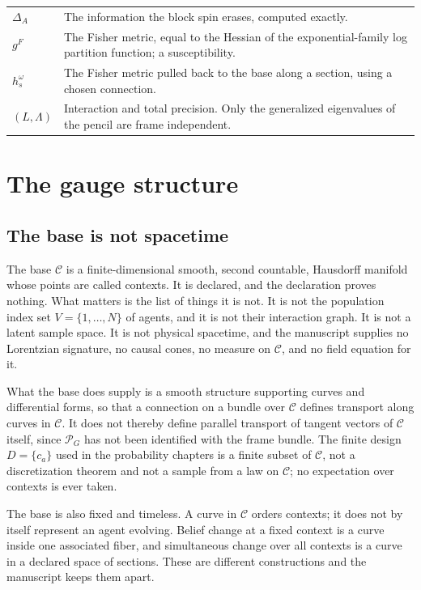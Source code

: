 \documentclass[11pt,letterpaper]{article}
\begin{document}
{\begin{longtable}{>{\raggedright\arraybackslash}p{}>{\raggedright\arraybackslash}p{}}
\(\Delta_A\) & The information the block spin erases, computed exactly. \\
\(g^F\) & The Fisher metric, equal to the Hessian of the exponential-family log partition function; a susceptibility. \\
\(h_s^\omega\) & The Fisher metric pulled back to the base along a section, using a chosen connection. \\
\((L,\Lambda)\) & Interaction and total precision. Only the generalized eigenvalues of the pencil are frame independent. \\
\end{longtable}
}

\section{The gauge structure}

\subsection{The base is not spacetime}
\label{sec:base}

The base \(\mathcal C\) is a finite-dimensional smooth, second countable, Hausdorff manifold whose points are called contexts. It is declared, and the declaration proves nothing. What matters is the list of things it is not. It is not the population index set \(V=\{1,\dots,N\}\) of agents, and it is not their interaction graph. It is not a latent sample space. It is not physical spacetime, and the manuscript supplies no Lorentzian signature, no causal cones, no measure on \(\mathcal C\), and no field equation for it.

What the base does supply is a smooth structure supporting curves and differential forms, so that a connection on a bundle over \(\mathcal C\) defines transport along curves in \(\mathcal C\). It does not thereby define parallel transport of tangent vectors of \(\mathcal C\) itself, since \(\mathscr P_G\) has not been identified with the frame bundle. The finite design \(D=\{c_a\}\) used in the probability chapters is a finite subset of \(\mathcal C\), not a discretization theorem and not a sample from a law on \(\mathcal C\); no expectation over contexts is ever taken.

The base is also fixed and timeless. A curve in \(\mathcal C\) orders contexts; it does not by itself represent an agent evolving. Belief change at a fixed context is a curve inside one associated fiber, and simultaneous change over all contexts is a curve in a declared space of sections. These are different constructions and the manuscript keeps them apart.
\end{document}
